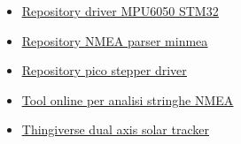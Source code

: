 \begin{itemize}
\item
  
  \href{https://github.com/Harinadha/STM32_MPU6050lib/blob/master/MPU6050.h}{\underline{Repository
  driver MPU6050 STM32}}
  
\item
  
  \href{https://github.com/kosma/minmea}{\underline{Repository NMEA
  parser minmea}}
  
\item
  
  \href{https://github.com/beshrkayali/pico_stepper}{\underline{Repository
  pico stepper driver}}
  
\item
  
  \href{https://swairlearn.bluecover.pt/nmea_analyser}{\underline{Tool
  online per analisi stringhe NMEA}}
  
\item
  
  \href{https://www.thingiverse.com/thing:53321}{\underline{Thingiverse
  dual axis solar tracker}}
  
\end{itemize}
